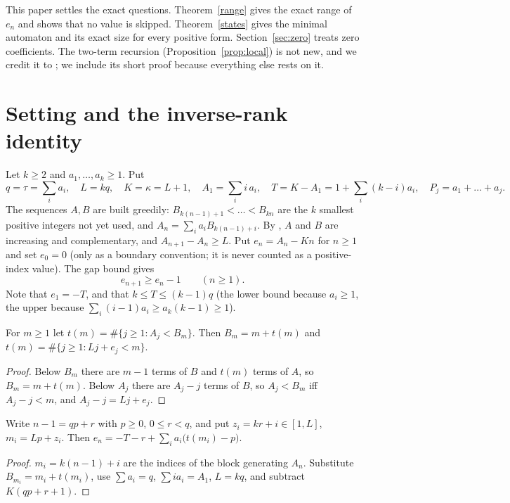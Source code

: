 \documentclass[11pt]{article}
\theoremstyle{remark}\newtheorem{remark}[theorem]{Remark}
\theoremstyle{definition}\newtheorem{definition}[theorem]{Definition}
\begin{document}
This paper settles the exact questions. Theorem~\ref{range} gives the exact range of \(e_n\) and shows that no value is skipped. Theorem~\ref{states} gives the minimal automaton and its exact size for every positive form. Section~\ref{sec:zero} treats zero coefficients. The two-term recursion (Proposition~\ref{prop:local}) is not new, and we credit it to \cite{cundric}; we include its short proof because everything else rests on it.

\section{Setting and the inverse-rank identity}
Let \(k\ge2\) and \(a_1,\dots,a_k\ge1\). Put
\[
q=\tau=\sum_i a_i,\quad L=kq,\quad K=\kappa=L+1,\quad A_1=\sum_i i\,a_i,\quad T=K-A_1=1+\sum_i(k-i)a_i,\quad P_j=a_1+\dots+a_j.
\]
The sequences \(A,B\) are built greedily: \(B_{k(n-1)+1}<\dots<B_{kn}\) are the \(k\) smallest positive integers not yet used, and \(A_n=\sum_i a_iB_{k(n-1)+i}\). By \cite{fj}, \(A\) and \(B\) are increasing and complementary, and \(A_{n+1}-A_n\ge L\). Put \(e_n=A_n-Kn\) for \(n\ge1\) and set \(e_0=0\) (only as a boundary convention; it is never counted as a positive-index value). The gap bound gives
\begin{equation}\label{gap}
e_{n+1}\ge e_n-1\qquad(n\ge1).
\end{equation}
Note that \(e_1=-T\), and that \(k\le T\le(k-1)q\) (the lower bound because \(a_i\ge1\), the upper because \(\sum_i(i-1)a_i\ge a_k(k-1)\ge1\)).

\begin{lemma}\label{rank}
For \(m\ge1\) let \(t(m)=\#\{j\ge1:A_j<B_m\}\). Then \(B_m=m+t(m)\) and \(t(m)=\#\{j\ge1:Lj+e_j<m\}\).
\end{lemma}
\begin{proof}
Below \(B_m\) there are \(m-1\) terms of \(B\) and \(t(m)\) terms of \(A\), so \(B_m=m+t(m)\). Below \(A_j\) there are \(A_j-j\) terms of \(B\), so \(A_j<B_m\) iff \(A_j-j<m\), and \(A_j-j=Lj+e_j\).
\end{proof}

\begin{lemma}\label{balance}
Write \(n-1=qp+r\) with \(p\ge0\), \(0\le r<q\), and put \(z_i=kr+i\in[1,L]\), \(m_i=Lp+z_i\). Then
\(e_n=-T-r+\sum_i a_i\bigl(t(m_i)-p\bigr)\).
\end{lemma}
\begin{proof}
\(m_i=k(n-1)+i\) are the indices of the block generating \(A_n\). Substitute \(B_{m_i}=m_i+t(m_i)\), use \(\sum a_i=q\), \(\sum ia_i=A_1\), \(L=kq\), and subtract \(K(qp+r+1)\).
\end{proof}
\end{document}
